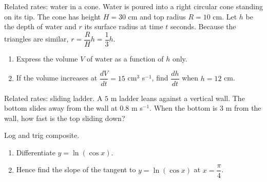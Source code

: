 \documentclass[11pt]{article}
\def\textbf#1{#1}%
\newcounter{question}
\begin{document}
\begin{question}
\textbf{Related rates: water in a cone.} Water is poured into a right circular cone standing on its tip. The cone has height $H=30$ cm and top radius $R=10$ cm. Let $h$ be the depth of water and $r$ its surface radius at time $t$ seconds. Because the triangles are similar, $r=\dfrac{R}{H}h=\dfrac{1}{3}h$.  
\begin{enumerate}
  \item Express the volume $V$ of water as a function of $h$ only.
  \item If the volume increases at $\dfrac{dV}{dt}=15$ cm$^{3}$ s$^{-1}$, find $\dfrac{dh}{dt}$ when $h=12$ cm.
\end{enumerate}

\begin{center}
\end{center}
\end{question}

\begin{question}
\textbf{Related rates: sliding ladder.} A $5$ m ladder leans against a vertical wall. The bottom slides away from the wall at $0.8$ m s$^{-1}$. When the bottom is $3$ m from the wall, how fast is the top sliding down?

\begin{center}
\end{center}
\end{question}

\begin{question}
\textbf{Log and trig composite.}
\begin{enumerate}
  \item Differentiate $y=\ln(\cos x)$.
  \item Hence find the slope of the tangent to $y=\ln(\cos x)$ at $x=\dfrac{\pi}{4}$.
\end{enumerate}
\end{question}
\end{document}
